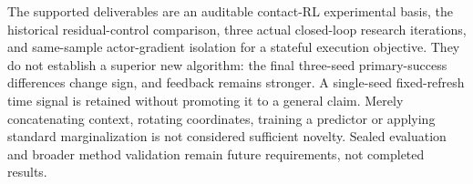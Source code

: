 The supported deliverables are an auditable contact-RL experimental basis, the historical residual-control comparison, three actual closed-loop research iterations, and same-sample actor-gradient isolation for a stateful execution objective. They do not establish a superior new algorithm: the final three-seed primary-success differences change sign, and feedback remains stronger. A single-seed fixed-refresh time signal is retained without promoting it to a general claim. Merely concatenating context, rotating coordinates, training a predictor or applying standard marginalization is not considered sufficient novelty. Sealed evaluation and broader method validation remain future requirements, not completed results.

